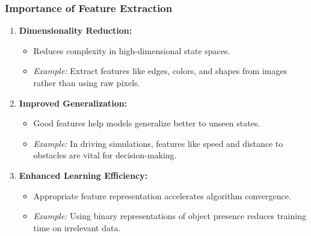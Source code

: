 \documentclass[aspectratio=169]{beamer}
\begin{document}
\begin{frame}[fragile]
  \frametitle{Importance of Feature Extraction}
  
  \begin{enumerate}
    \item \textbf{Dimensionality Reduction:}
      \begin{itemize}
        \item Reduces complexity in high-dimensional state spaces.
        \item \textit{Example:} Extract features like edges, colors, and shapes from images rather than using raw pixels.
      \end{itemize}
      
    \item \textbf{Improved Generalization:}
      \begin{itemize}
        \item Good features help models generalize better to unseen states.
        \item \textit{Example:} In driving simulations, features like speed and distance to obstacles are vital for decision-making.
      \end{itemize}
      
    \item \textbf{Enhanced Learning Efficiency:}
      \begin{itemize}
        \item Appropriate feature representation accelerates algorithm convergence.
        \item \textit{Example:} Using binary representations of object presence reduces training time on irrelevant data.
      \end{itemize}
  \end{enumerate}
\end{frame}
\end{document}
